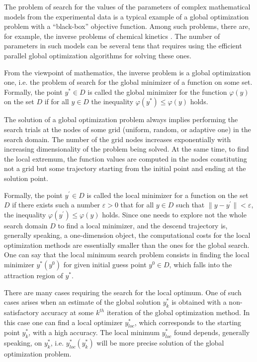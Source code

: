 \documentclass[runningheads]{llncs}
\begin{document}
The problem of search for the values of the parameters of complex mathematical models from the experimental data is a typical example of a global optimization problem with a ``black-box'' objective function. Among such problems, there are, for example, the inverse problems of chemical kinetics \cite{Akhmadullina2017,Nurislamova2016}. The number of parameters in such models can be several tens that requires using the efficient parallel global optimization algorithms for solving these ones.

From the viewpoint of mathematics, the inverse problem is a global optimization one, i.e. the problem of search for the global minimizer of a function on some set. Formally, the point $y^{*} \in D$ is called the global minimizer for the function $\varphi(y)$ on the set $D$ if for all $y \in D$ the inequality $\varphi(y^{*}) \leq \varphi(y)$ holds.

The solution of a global optimization problem always implies performing the search trials at the nodes of some grid (uniform, random, or adaptive one) in the search domain. The number of the grid nodes increases exponentially with increasing dimensionality of the problem being solved. At the same time, to find the local extremum, the function values are computed in the nodes constituting not a grid but some trajectory starting from the initial  point and ending at the solution point. 

Formally, the point $y^{\prime} \in D$ is called the local minimizer for a function on the set $D$ if there exists such a number $\varepsilon > 0$ that for all $y \in D$ such that $\|y - y^{\prime}\| < \varepsilon$, the inequality $\varphi(y^{\prime}) \leq \varphi(y)$ holds. Since one needs to explore not the whole search domain $D$ to find a local minimizer, and the descend trajectory is, generally speaking, a one-dimension object, the computational costs for the local optimization methods are essentially smaller than the ones for the global search.
One can say that the local minimum search problem consists in finding the local minimizer $y^{*}(y^{0})$ for given initial guess point $y^{0} \in D$, which falls into the attraction region of $y^{*}$.

There are many cases requiring the search for the local optimum. One of such cases arises when an estimate of the global solution $y_k^*$ is obtained with a non-satisfactory accuracy at some $k^{th}$ iteration of the global optimization method. In this case one can find a local optimizer $y_{loc}^*$, which corresponds to the starting point $y_k^*$, with a high accuracy. The local minimum $y_{loc}^*$ found depends, generally speaking, on $y_k^*$, i.e. $y_{loc}^*(y_k^*)$ will be more precise solution of the global optimization problem.
\end{document}
